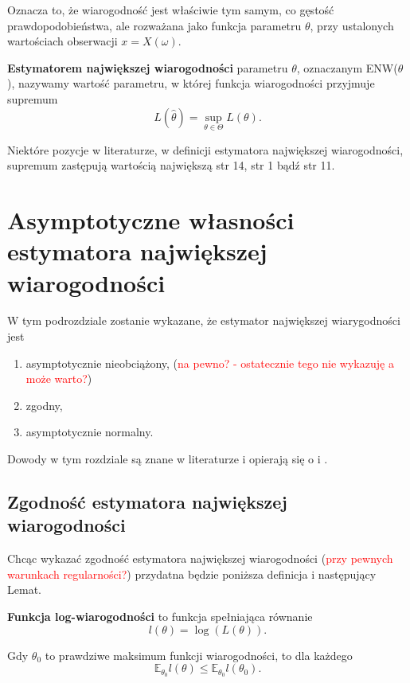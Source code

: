 Oznacza to, że wiarogodność jest właściwie tym samym, co gęstość prawdopodobieństwa,
ale rozważana jako funkcja parametru $\theta$, przy ustalonych wartościach obserwacji
$x = X(\omega)$.


\begin{definition}
\textbf{Estymatorem największej wiarogodności} parametru $\theta$, oznaczanym ENW($\theta$), nazywamy wartość parametru, w której funkcja
wiarogodności przyjmuje supremum $$L(\hat{\theta}) = \sup_{\theta \in \Theta} L(\theta).$$

\end{definition}

Niektóre pozycje w literaturze, w definicji estymatora największej wiarogodności, supremum zastępują wartością największą \cite{rydl1} str 14, \cite{sfu1} str 1 bądź \cite{mit0} str 11.

\section{Asymptotyczne własności estymatora największej wiarogodności}

W tym podrozdziale zostanie wykazane, że estymator największej wiarygodności jest
\begin{enumerate}
\item asymptotycznie nieobciążony, (\textcolor{red}{na pewno? - ostatecznie tego nie wykazuję a może warto?})
\item zgodny,
\item asymptotycznie normalny.
\end{enumerate}

Dowody w tym rozdziale są znane w literaturze i opierają się o \cite{mit1} i \cite{sfu1}.



\subsection{Zgodność estymatora największej wiarogodności}

Chcąc wykazać zgodność estymatora największej wiarogodności (\textcolor{red}{przy pewnych warunkach regularności?})
przydatna będzie poniższa definicja i następujący Lemat.
\begin{definition}
\textbf{Funkcja log-wiarogodności} to funkcja spełniająca równanie
$$l(\theta) = \log(L(\theta)).$$
\end{definition}

\begin{lemma}\label{l:pierwszy}
Gdy $\theta_0$ to prawdziwe maksimum funkcji wiarogodności, to dla każdego \text{$\theta \in \Theta$}
$$\mathbb{E}_{\theta_0}l(\theta) \leq \mathbb{E}_{\theta_0}l(\theta_0).$$
\end{lemma}

